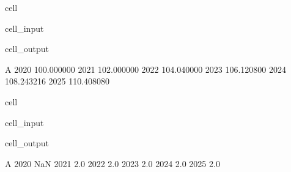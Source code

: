 \documentclass[letterpaper,10pt,english]{jupyterBook}
\begin{document}
\begin{sphinxuseclass}{cell}\begin{sphinxVerbatimInput}

\begin{sphinxuseclass}{cell_input}
\begin{sphinxVerbatim}[commandchars=\\\{\}]
  
\end{sphinxVerbatim}

\end{sphinxuseclass}\end{sphinxVerbatimInput}
\begin{sphinxVerbatimOutput}

\begin{sphinxuseclass}{cell_output}
\begin{sphinxVerbatim}[commandchars=\\\{\}]
               A
2020  100.000000
2021  102.000000
2022  104.040000
2023  106.120800
2024  108.243216
2025  110.408080
\end{sphinxVerbatim}

\end{sphinxuseclass}\end{sphinxVerbatimOutput}

\end{sphinxuseclass}
\begin{sphinxuseclass}{cell}\begin{sphinxVerbatimInput}

\begin{sphinxuseclass}{cell_input}
\begin{sphinxVerbatim}[commandchars=\\\{\}]
 
\end{sphinxVerbatim}

\end{sphinxuseclass}\end{sphinxVerbatimInput}
\begin{sphinxVerbatimOutput}

\begin{sphinxuseclass}{cell_output}
\begin{sphinxVerbatim}[commandchars=\\\{\}]
        A
2020  NaN
2021  2.0
2022  2.0
2023  2.0
2024  2.0
2025  2.0
\end{sphinxVerbatim}

\end{sphinxuseclass}\end{sphinxVerbatimOutput}

\end{sphinxuseclass}
\end{document}

